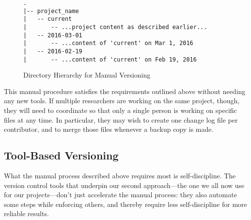 \documentclass[10pt]{article}
\begin{document}
\begin{figure}
\begin{verbatim}
.
|-- project_name
|   -- current
|       -- ...project content as described earlier...
|   -- 2016-03-01
|       -- ...content of 'current' on Mar 1, 2016
|   -- 2016-02-19
|       -- ...content of 'current' on Feb 19, 2016
\end{verbatim}
\caption{Directory Hierarchy for Manual Versioning}
\label{fig:manual}
\end{figure}

This manual procedure satisfies the requirements outlined above
without needing any new tools. If multiple researchers are working on
the same project, though, they will need to coordinate so that only a
single person is working on specific files at any time. In particular,
they may wish to create one change log file per contributor, and to
merge those files whenever a backup copy is made.

\subsection*{Tool-Based Versioning}

What the manual process described above requires most is
self-discipline. The version control tools that underpin our second
approach---the one we all now use for our projects---don't just
accelerate the manual process: they also automate some steps while
enforcing others, and thereby require less self-discipline for more
reliable results.
\end{document}
